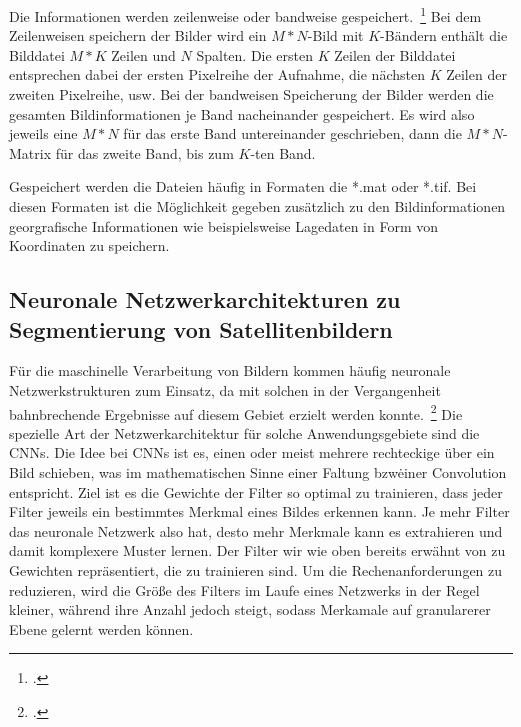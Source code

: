 Die Informationen werden zeilenweise oder bandweise gespeichert.~\footcite[\vglf][]{upadhyay.2012}
Bei dem Zeilenweisen speichern der Bilder wird ein \(M*N\)-Bild mit \(K\)-Bändern enthält die Bilddatei \(M*K\) Zeilen
und \(N\) Spalten.
Die ersten \(K\) Zeilen der Bilddatei entsprechen dabei der ersten Pixelreihe der Aufnahme, die nächsten \(K\) Zeilen
der zweiten Pixelreihe, usw.
Bei der bandweisen Speicherung der Bilder werden die gesamten Bildinformationen je Band nacheinander gespeichert.
Es wird also jeweils eine \(M*N\) für das erste Band untereinander geschrieben, dann die \(M*N\)-Matrix für das zweite
Band, bis zum \(K\)-ten Band.

Gespeichert werden die Dateien häufig in Formaten die *.mat oder *.tif.
Bei diesen Formaten ist die Möglichkeit gegeben zusätzlich zu den Bildinformationen georgrafische Informationen wie
beispielsweise Lagedaten in Form von Koordinaten zu speichern.

\subsection{Neuronale Netzwerkarchitekturen zu Segmentierung von Satellitenbildern}

Für die maschinelle Verarbeitung von Bildern kommen häufig neuronale Netzwerkstrukturen zum Einsatz, da mit solchen in
der Vergangenheit bahnbrechende Ergebnisse auf diesem Gebiet erzielt werden konnte.~\footcite[\vglf][]{pritt.2020}
Die spezielle Art der Netzwerkarchitektur für solche Anwendungsgebiete sind die \ac{CNN}s.
Die Idee bei \ac{CNN}s ist es, einen oder meist mehrere rechteckige \grqq über ein Bild schieben, was im
mathematischen Sinne einer Faltung bzw\. einer Convolution entspricht.
Ziel ist es die Gewichte der Filter so optimal zu trainieren, dass jeder Filter jeweils ein bestimmtes Merkmal eines Bildes
erkennen kann.
Je mehr Filter das neuronale Netzwerk also hat, desto mehr Merkmale kann es extrahieren und damit komplexere Muster lernen.
Der Filter wir wie oben bereits erwähnt von zu Gewichten repräsentiert, die zu trainieren sind.
Um die Rechenanforderungen zu reduzieren, wird die Größe des Filters im Laufe eines Netzwerks in der Regel kleiner,
während ihre Anzahl jedoch steigt, sodass Merkamale auf granularerer Ebene gelernt werden können.

